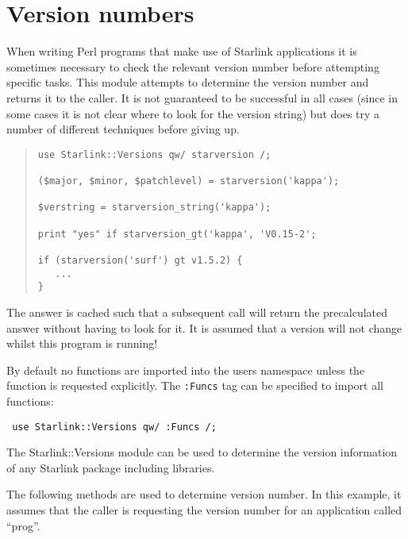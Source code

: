 \documentclass[twoside,11pt]{article}
\newenvironment{myquote}{\begin{quote}\begin{small}}{\end{small}\end{quote}}
\renewcommand{\_}{\texttt{\symbol{95}}}
\begin{document}
\section{Version numbers}


When writing Perl programs that make use of Starlink applications
it is sometimes necessary to check the relevant version number
before attempting specific tasks. This module attempts to determine
the version number and returns it to the caller. It is not guaranteed
to be successful in all cases (since in some cases it is not
clear where to look for the version string) but does try a number of different 
techniques before giving up.

\begin{myquote}
\begin{verbatim}
use Starlink::Versions qw/ starversion /;

($major, $minor, $patchlevel) = starversion('kappa');

$verstring = starversion_string('kappa');

print "yes" if starversion_gt('kappa', 'V0.15-2';

if (starversion('surf') gt v1.5.2) {
   ...
}
\end{verbatim}
\end{myquote}



The answer is cached such that a subsequent call will return the
precalculated answer without having to look for it. It is assumed that
a version will not change whilst this program is running!



By default no functions are imported into the users namespace unless
the function is requested explicitly. The \texttt{:Funcs} tag can be
specified to import all functions:

\begin{verbatim}
 use Starlink::Versions qw/ :Funcs /;
\end{verbatim}

The Starlink::Versions module can be used to determine the version
information of any Starlink package including libraries.

The following methods are used to determine version number.
In this example, it assumes that the caller is requesting the
version number for an application called ``prog''.
\end{document}
